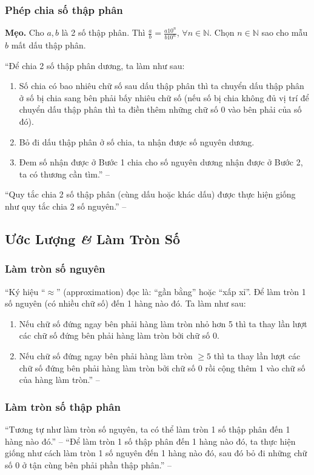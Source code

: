 \documentclass{article}
\numberwithin{equation}{section}
\begin{document}
\subsubsection{Phép chia số thập phân}
\textbf{Mẹo.} Cho $a,b$ là 2 số thập phân. Thì $\frac{a}{b} = \frac{a10^n}{b10^n}$, $\forall n\in\mathbb{N}$. Chọn $n\in\mathbb{N}$ sao cho mẫu $b$ mất dấu thập phân.

``Để chia 2 số thập phân dương, ta làm như sau:
\begin{enumerate}
	\item Số chia có bao nhiêu chữ số sau dấu thập phân thì ta chuyển dấu thập phân ở số bị chia sang bên phải bấy nhiêu chữ số (nếu số bị chia không đủ vị trí để chuyển dấu thập phân thì ta điền thêm những chữ số 0 vào bên phải của số đó).
	\item Bỏ đi dấu thập phân ở số chia, ta nhận được số nguyên dương.
	\item Đem số nhận được ở Bước 1 chia cho số nguyên dương nhận được ở Bước 2, ta có thương cần tìm.'' -- \cite[p. 54]{Thai_Anh_Dat_Ha_Loan_Nam_Quang_Toan_6_tap_2}
\end{enumerate}
``Quy tắc chia 2 số thập phân (cùng dấu hoặc khác dấu) được thực hiện giống như quy tắc chia 2 số nguyên.'' -- \cite[p. 55]{Thai_Anh_Dat_Ha_Loan_Nam_Quang_Toan_6_tap_2}

\subsection{Ước Lượng \textit{\&} Làm Tròn Số}

\subsubsection{Làm tròn số nguyên}
``Ký hiệu ``$\approx$'' (approximation) đọc là: ``gần bằng'' hoặc ``xấp xỉ''. Để làm tròn 1 số nguyên (có nhiều chữ số) đến 1 hàng nào đó. Ta làm như sau:
\begin{enumerate}
	\item Nếu chữ số đứng ngay bên phải hàng làm tròn nhỏ hơn 5 thì ta thay lần lượt các chữ số đứng bên phải hàng làm tròn bởi chữ số 0.
	\item Nếu chữ số đứng ngay bên phải hàng làm tròn $\ge 5$ thì ta thay lần lượt các chữ số đứng bên phải hàng làm tròn bởi chữ số 0 rồi cộng thêm 1 vào chữ số của hàng làm tròn.'' -- \cite[p. 58]{Thai_Anh_Dat_Ha_Loan_Nam_Quang_Toan_6_tap_2}
\end{enumerate}

\subsubsection{Làm tròn số thập phân}
``Tương tự như làm tròn số nguyên, ta có thể làm tròn 1 số thập phân đến 1 hàng nào đó.'' -- \cite[p. 58]{Thai_Anh_Dat_Ha_Loan_Nam_Quang_Toan_6_tap_2} ``Để làm tròn 1 số thập phân đến 1 hàng nào đó, ta thực hiện giống như cách làm tròn 1 số nguyên đến 1 hàng nào đó, sau đó bỏ đi những chữ số 0 ở tận cùng bên phải phần thập phân.'' -- \cite[p. 59]{Thai_Anh_Dat_Ha_Loan_Nam_Quang_Toan_6_tap_2}
\end{document}
